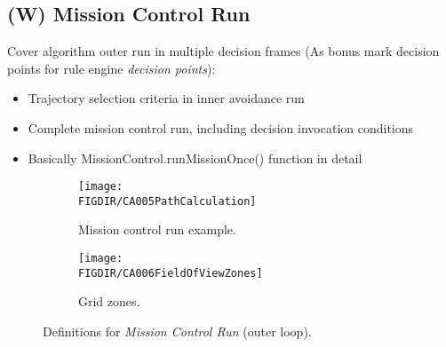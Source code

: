 \setcounter{chapter}{6}
\setcounter{section}{7}
\setcounter{subsection}{2}

\subsection{(W) Mission Control Run}\label{s:missionControlRun}
    \noindent Cover algorithm outer run in multiple decision frames (As bonus mark decision points for rule engine \emph{decision points}):
    \begin{itemize}


        \item Trajectory selection criteria in inner avoidance run
        \item Complete mission control run, including decision invocation conditions
        \item Basically MissionControl.runMissionOnce() function in detail

    \end{itemize}

    \begin{figure}[H]
	    \centering
        \begin{subfigure}{0.48\textwidth}
	        \centering
            \texttt{[image: \\FIGDIR/CA005PathCalculation]}
            \caption{Mission control run example.}
            \label{fig:missionControlRunExample}
        \end{subfigure}
        \begin{subfigure}{0.48\textwidth}
        	\centering
            \texttt{[image: \\FIGDIR/CA006FieldOfViewZones]} 
            \caption{Grid zones.}
            \label{fig:gridZonesMissionControl}
        \end{subfigure}
        \caption{Definitions for \emph{Mission Control Run} (outer loop).}
        \label{fig:definitionsForMissionControlRun}
    \end{figure}
    
    


